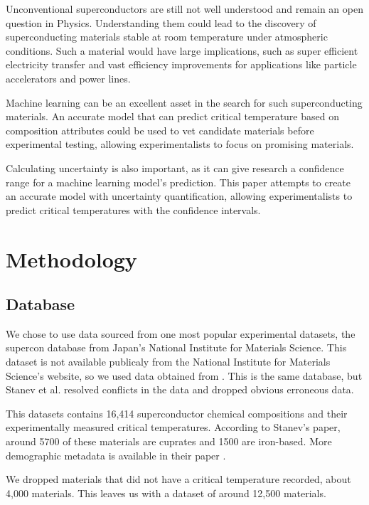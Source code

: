 \documentclass[twocolumn, nofootinbib, secnumarabic, amssymb, nobibnotes, aps, prd]{revtex4-2}
\begin{document}
Unconventional superconductors are still not well understood and remain an open question in Physics. Understanding them could lead to the discovery of superconducting materials stable at room temperature under atmospheric conditions. Such a material would have large implications, such as super efficient electricity transfer and vast efficiency improvements for applications like particle accelerators and power lines.

Machine learning can be an excellent asset in the search for such superconducting materials. An accurate model that can predict critical temperature based on composition attributes could be used to vet candidate materials before experimental testing, allowing experimentalists to focus on promising materials. 

Calculating uncertainty is also important, as it can give research a confidence range for a machine learning model's prediction. This paper attempts to create an accurate model with uncertainty quantification, allowing experimentalists to predict critical temperatures with the confidence intervals.

\section{Methodology}
\subsection{Database}
We chose to use data sourced from one most popular experimental datasets, the supercon database from Japan's National Institute for Materials Science. This dataset is not available publicaly from the National Institute for Materials Science's website, so we used data obtained from \cite{Stanev2018}. This is the same database, but Stanev et al. resolved conflicts in the data and dropped obvious erroneous data.

This datasets contains 16,414 superconductor chemical compositions and their experimentally measured critical temperatures. According to Stanev's paper, around 5700 of these materials are cuprates and 1500 are iron-based. More demographic metadata is available in their paper \cite{Stanev2018}. 

We dropped materials that did not have a critical temperature recorded, about 4,000 materials. This leaves us with a dataset of around 12,500 materials. %
\end{document}
